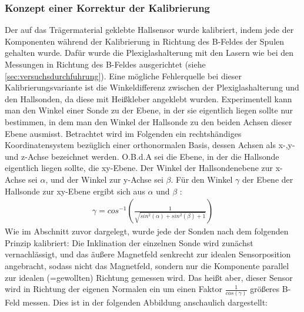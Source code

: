 \documentclass[12pt,a4paper]{article}
\begin{document}
\subsubsection{Konzept einer Korrektur der Kalibrierung}
\label{ch:korr}
Der auf das Trägermaterial geklebte Hallsensor wurde kalibriert, indem jede der Komponenten während der Kalibrierung in Richtung des B-Feldes der Spulen gehalten wurde.
Dafür wurde die Plexiglashalterung mit den Lasern wie bei den Messungen in Richtung des B-Feldes ausgerichtet (siehe \ref{sec:versuchsdurchfuhrung}). Eine mögliche Fehlerquelle bei dieser Kalibrierungsvariante ist die Winkeldifferenz zwischen der Plexiglashalterung und den Hallsonden, da diese mit Heißkleber angeklebt wurden. Experimentell kann man den Winkel einer Sonde zu der Ebene, in der sie eigentlich liegen sollte nur bestimmen, in dem man den Winkel der Hallsonde zu den beiden Achsen dieser Ebene ausmisst.
Betrachtet wird im Folgenden ein rechtshändiges Koordinatensystem bezüglich einer orthonormalen Basis, dessen Achsen als x-,y- und z-Achse  bezeichnet werden. O.B.d.A sei die Ebene, in der die Hallsonde eigentlich liegen sollte, die xy-Ebene. Der Winkel der Hallsondenebene zur x-Achse sei $\alpha$, und der Winkel zur y-Achse sei $\beta$. Für den Winkel $\gamma$ der Ebene der Hallsonde zur xy-Ebene ergibt sich aus $\alpha$ und $\beta$ :
\begin{align*}
\gamma = cos^{-1}\left(\frac{1}{\sqrt{sin^2(\alpha)+sin^2(\beta)+1}}\right)
\end{align*}
Wie im Abschnitt zuvor dargelegt, wurde jede der Sonden nach dem folgenden Prinzip kalibriert: Die Inklination der einzelnen Sonde wird zunächst vernachlässigt, und das äußere Magnetfeld senkrecht zur idealen Sensorposition angebracht, sodass nicht das Magnetfeld, sondern nur die Komponente parallel zur idealen (=gewollten) Richtung gemessen wird. Das heißt aber, dieser Sensor wird in Richtung der eigenen Normalen ein um einen Faktor $\frac{1}{cos(\gamma)}$ größeres B-Feld messen. Dies ist in der folgenden Abbildung anschaulich dargestellt:
\end{document}

